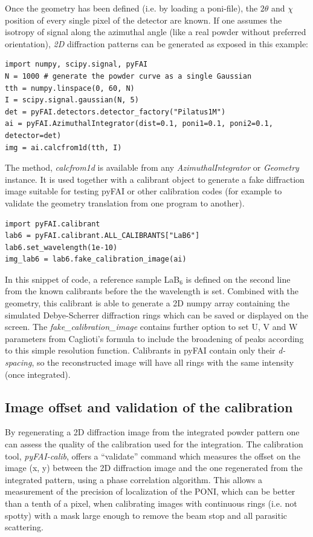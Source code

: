 \documentclass[preprint]{iucr}
\begin{document}
Once the geometry has been defined (i.e. by loading a poni-file), the $2\theta$
and $\chi$ position of every single pixel of the detector are known.
If one assumes the isotropy of signal along the azimuthal angle (like a real
powder without preferred orientation), \textit{2D} diffraction patterns can be
generated as exposed in this example:

\begin{verbatim}
import numpy, scipy.signal, pyFAI
N = 1000 # generate the powder curve as a single Gaussian
tth = numpy.linspace(0, 60, N)
I = scipy.signal.gaussian(N, 5)
det = pyFAI.detectors.detector_factory("Pilatus1M")
ai = pyFAI.AzimuthalIntegrator(dist=0.1, poni1=0.1, poni2=0.1, detector=det)
img = ai.calcfrom1d(tth, I)
\end{verbatim}


The method, \textit{calcfrom1d} is available from any
\textit{AzimuthalIntegrator} or \textit{Geometry} instance.
It is used together with a calibrant object to generate a fake diffraction image
suitable for testing pyFAI or other calibration codes (for example to validate
the geometry translation from one program to another).


\begin{verbatim}
import pyFAI.calibrant
lab6 = pyFAI.calibrant.ALL_CALIBRANTS["LaB6"]
lab6.set_wavelength(1e-10)
img_lab6 = lab6.fake_calibration_image(ai)
\end{verbatim}

In this snippet of code, a reference sample LaB$_6$ is defined on the second
line from the known calibrants before the the wavelength is set.
Combined with the geometry, this calibrant is able to
generate a 2D numpy array containing the simulated Debye-Scherrer diffraction
rings which can be saved or displayed on the screen.
The \textit{fake\_calibration\_image} contains further option to set U, V and W
parameters from Caglioti's formula \cite{caglioti} to include the
broadening of peaks according to this simple resolution function.
Calibrants in pyFAI contain only their \textit{d-spacing}, so the
reconstructed image will have all rings with the same
intensity (once integrated).

\subsection{Image offset and validation of the calibration}
By regenerating a 2D diffraction image from the integrated powder pattern one
can assess the quality of the calibration used for the integration.
The calibration tool, \textit{pyFAI-calib}, offers  a ``validate'' command which
measures the offset on the image (x, y) between the 2D diffraction image and the
one regenerated from the integrated pattern, using a phase correlation
algorithm.
This allows a measurement of the precision of localization of the PONI, which
can be better than a tenth of a pixel, when calibrating images with continuous
rings (i.e. not spotty) with a mask large enough to remove the beam stop and
all parasitic scattering.
\end{document}
